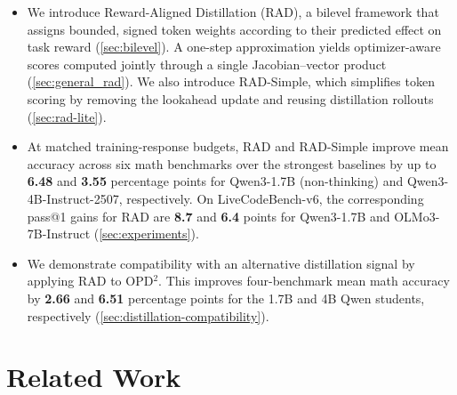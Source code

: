 \documentclass{article} %
\begin{document}
\begin{mainbox}
\begin{itemize}
    \item We introduce Reward-Aligned Distillation (RAD), a bilevel framework that assigns 
    bounded, signed token weights according to their predicted effect on task reward (\cref{sec:bilevel}). 
    A one-step approximation yields optimizer-aware scores computed jointly through a single Jacobian--vector product (\cref{sec:general_rad}). 
    We also introduce RAD-Simple, which simplifies token scoring by removing the lookahead update and reusing distillation rollouts (\cref{sec:rad-lite}).

    \item At matched training-response budgets, RAD and RAD-Simple improve mean accuracy across six math benchmarks over the
    strongest baselines by up to \textbf{6.48} and \textbf{3.55} percentage points for Qwen3-1.7B (non-thinking) and
    Qwen3-4B-Instruct-2507, respectively. 
    On LiveCodeBench-v6, the corresponding pass@1 gains for RAD are \textbf{8.7} and \textbf{6.4} points for Qwen3-1.7B and OLMo3-7B-Instruct (\cref{sec:experiments}).

    \item We demonstrate compatibility with an alternative distillation signal by applying RAD to OPD$^2$. 
    This improves four-benchmark mean math accuracy by \textbf{2.66} and \textbf{6.51} percentage points for the 1.7B and 4B Qwen students, respectively (\cref{sec:distillation-compatibility}).
\end{itemize}

\end{mainbox}

\section{Related Work}
\end{document}
